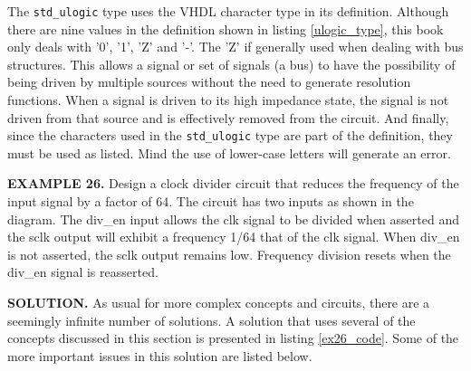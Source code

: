 The \texttt{std\_ulogic} type uses the VHDL character type in its definition. Although there are nine values in the definition shown in listing \ref{ulogic_type}, this book only deals with '0', '1', 'Z' and '-'. The 'Z' if generally used when dealing with bus structures. This allows a signal or set of signals (a bus) to have the possibility of being driven by multiple sources without the need to generate resolution functions. When a signal is driven to its high impedance state, the signal is not driven from that source and is effectively removed from the circuit. And finally, since the characters used in the \texttt{std\_ulogic} type are part of the definition, they must be used as listed. Mind the use of lower-case letters will generate an error. 
\begin{leftbar}
\begin{minipage}[t]{0.52\textwidth}
\vspace{10pt}
\noindent
\textbf{EXAMPLE 26.}
Design a clock divider circuit that reduces the frequency of the input signal by a factor of 64. The circuit has two inputs as shown in the diagram. The div\_en input allows the clk signal to be divided when asserted and the sclk output will exhibit a frequency 1/64 that of the clk signal. When div\_en is not asserted, the sclk output remains low. Frequency division resets when the div\_en signal is reasserted.
\end{minipage}
\begin{minipage}[t]{0.4\linewidth}
\vspace{10pt}
\begin{flushright}
\end{flushright}
\end{minipage}
\end{leftbar}
\noindent
\textbf{SOLUTION.} As usual for more complex concepts and circuits, there are a seemingly infinite number of solutions. A solution that uses several of the concepts discussed in this section is presented in listing \ref{ex26_code}. Some of the more important issues in this solution are listed below.

